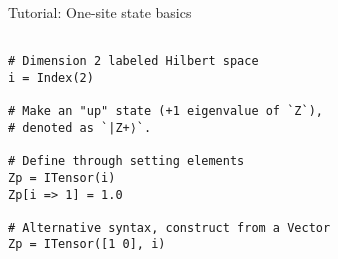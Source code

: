 \begin{frame}[fragile]{Tutorial: One-site state basics}

\begin{lstlisting}

# Dimension 2 labeled Hilbert space
i = Index(2)

# Make an "up" state (+1 eigenvalue of `Z`),
# denoted as `|Z+⟩`.

# Define through setting elements
Zp = ITensor(i)
Zp[i => 1] = 1.0

# Alternative syntax, construct from a Vector
Zp = ITensor([1 0], i)

\end{lstlisting}

\end{frame}
